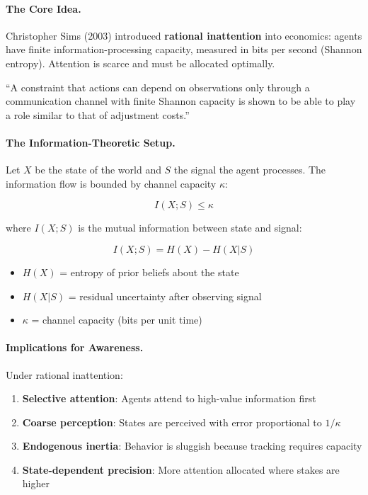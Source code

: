 \paragraph{The Core Idea.}
Christopher Sims (2003) introduced \textbf{rational inattention} into economics: 
agents have finite information-processing capacity, measured in bits per second 
(Shannon entropy). Attention is scarce and must be allocated optimally.

\begin{tcolorbox}[colback=blue!5!white, colframe=blue!75!black, title=Sims (2003): Implications of Rational Inattention]
``A constraint that actions can depend on observations only through a 
communication channel with finite Shannon capacity is shown to be able to 
play a role similar to that of adjustment costs.''
\end{tcolorbox}

\paragraph{The Information-Theoretic Setup.}
Let $X$ be the state of the world and $S$ the signal the agent processes. 
The information flow is bounded by channel capacity $\kappa$:

\begin{equation}
\boxed{I(X; S) \leq \kappa}
\label{eq:capacity-constraint}
\end{equation}

where $I(X; S)$ is the mutual information between state and signal:

\begin{equation}
I(X; S) = H(X) - H(X|S)
\end{equation}

\begin{itemize}
\item $H(X)$ = entropy of prior beliefs about the state
\item $H(X|S)$ = residual uncertainty after observing signal
\item $\kappa$ = channel capacity (bits per unit time)
\end{itemize}

\paragraph{Implications for Awareness.}
Under rational inattention:

\begin{enumerate}
\item \textbf{Selective attention}: Agents attend to high-value information first
\item \textbf{Coarse perception}: States are perceived with error proportional to $1/\kappa$
\item \textbf{Endogenous inertia}: Behavior is sluggish because tracking requires capacity
\item \textbf{State-dependent precision}: More attention allocated where stakes are higher
\end{enumerate}

